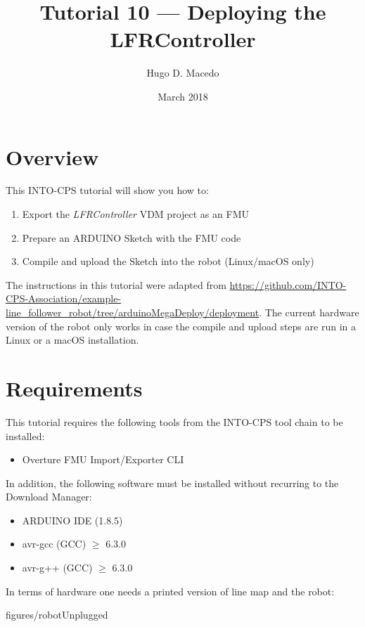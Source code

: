 \documentclass[11pt,a4paper]{../tutorial}
\title{Tutorial 10 --- Deploying the LFRController}
\date{March 2018}
\author{Hugo D. Macedo}
\begin{document}
\section*{Overview}

This INTO-CPS tutorial will show you how to:

\begin{enumerate}[noitemsep]

\item Export the \emph{LFRController} VDM project as an FMU
\item Prepare an ARDUINO Sketch with the FMU code 
\item Compile and upload the Sketch into the robot (Linux/macOS only)
\end{enumerate}

The instructions in this tutorial were adapted from \url{https://github.com/INTO-CPS-Association/example-line\_follower_robot/tree/arduinoMegaDeploy/deployment}. The current hardware version of the robot only works in case the compile and upload steps are run in a Linux or a macOS installation. 

\section*{Requirements}

This tutorial requires the following tools from the INTO-CPS tool chain to be installed:

\begin{itemize}[noitemsep]
\item Overture FMU Import/Exporter CLI
\end{itemize}

In addition, the following software must be installed without recurring to the Download Manager: 

\begin{itemize}[noitemsep]
\item ARDUINO IDE (1.8.5) 
\item avr-gcc (GCC) $\geq$ 6.3.0
\item avr-g++ (GCC) $\geq$ 6.3.0   
\end{itemize}

In terms of hardware one needs a printed version of line map and the robot:

\begin{annotation}[width=0.85\linewidth,trim={20cm 20cm 20cm 20cm},clip]{figures/robotUnplugged}
\end{annotation}
\end{document}
